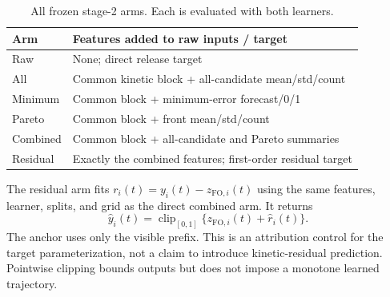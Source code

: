 \documentclass[conference,letterpaper]{IEEEtran}
\newcommand{\clip}{\operatorname{clip}_{[0,1]}}
\begin{document}
\begin{table}[t]
\caption{All frozen stage-2 arms. Each is evaluated with both learners.}
\label{tab:arms}\centering\small
\begin{tabularx}{\columnwidth}{@{}lY@{}}\toprule
Arm & Features added to raw inputs / target \\\midrule
Raw & None; direct release target \\
All & Common kinetic block + all-candidate mean/std/count \\
Minimum & Common block + minimum-error forecast/0/1 \\
Pareto & Common block + front mean/std/count \\
Combined & Common block + all-candidate and Pareto summaries \\
Residual & Exactly the combined features; first-order residual target \\\bottomrule
\end{tabularx}
\end{table}

The residual arm fits $r_i(t)=y_i(t)-z_{\mathrm{FO},i}(t)$ using the same features, learner, splits, and grid as the direct combined arm. It returns
\begin{equation}
 \hat y_i(t)=\clip\{z_{\mathrm{FO},i}(t)+\hat r_i(t)\}.
\end{equation}
The anchor uses only the visible prefix. This is an attribution control for the target parameterization, not a claim to introduce kinetic-residual prediction. Pointwise clipping bounds outputs but does not impose a monotone learned trajectory.
\end{document}
